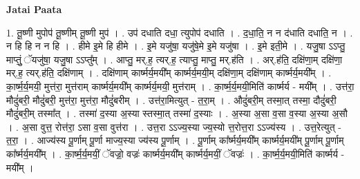 \documentclass[17pt]{extarticle}
\begin{document}
\textbf{Jatai Paata} \newline

1. तू॒ष्णी मुपोप॑ तू॒ष्णीम् तू॒ष्णी मुप॑ । . उप॑ दधाति दधा॒ त्युपोप॑ दधाति । . द॒धा॒ति॒ न न द॑धाति दधाति॒ न । . न हि हि न न हि । . हीमे इ॒मे हि हीमे । . इ॒मे यजु॑षा॒ यजु॑षे॒मे इ॒मे यजु॑षा । . इ॒मे इती॒मे । . यजु॒षा ऽऽप्तु॒ माप्तुं॒ ॅयजु॑षा॒ यजु॒षा ऽऽप्तु᳚म् । . आप्तु॒ मर्.ह॒ त्यर्.ह॒ त्याप्तु॒ माप्तु॒ मर्.ह॑ति । . अर्.ह॑ति॒ दक्षि॑णा॒म् दक्षि॑णा॒ मर्.ह॒ त्यर्.ह॑ति॒ दक्षि॑णाम् । . दक्षि॑णाम् कार्ष्मर्य॒मयी᳚म् कार्ष्मर्य॒मयी॒म् दक्षि॑णा॒म् दक्षि॑णाम् कार्ष्मर्य॒मयी᳚म् । . का॒र्ष्म॒र्य॒मयी॒ मुत्त॑रा॒ मुत्त॑राम् कार्ष्मर्य॒मयी᳚म् कार्ष्मर्य॒मयी॒ मुत्त॑राम् । . का॒र्ष्म॒र्य॒मयी॒मिति॑ कार्ष्मर्य - मयी᳚म् । . उत्त॑रा॒ मौदुं॑बरी॒ मौदुं॑बरी॒ मुत्त॑रा॒ मुत्त॑रा॒ मौदुं॑बरीम् । . उत्त॑रा॒मित्युत् - त॒रा॒म् । . औदुं॑बरी॒म् तस्मा॒त् तस्मा॒ दौदुं॑बरी॒ मौदुं॑बरी॒म् तस्मा᳚त् । . तस्मा॑ द॒स्या अ॒स्या स्तस्मा॒त् तस्मा॑ द॒स्याः । . अ॒स्या अ॒सा व॒सा व॒स्या अ॒स्या अ॒सौ । . अ॒सा वुत्त॒ रोत्त॑रा॒ ऽसा व॒सा वुत्त॑रा । . उत्त॒रा ऽऽज्य॒स्या ज्य॒स्यो त्त॒रोत्त॒रा ऽऽज्य॑स्य । . उत्त॒रेत्युत् - त॒रा॒ । . आज्य॑स्य पू॒र्णाम् पू॒र्णा माज्य॒स्या ज्य॑स्य पू॒र्णाम् । . पू॒र्णाम् का᳚र्ष्मर्य॒मयी᳚म् कार्ष्मर्य॒मयी᳚म् पू॒र्णाम् पू॒र्णाम् का᳚र्ष्मर्य॒मयी᳚म् । . का॒र्ष्म॒र्य॒मयीं॒ ॅवज्रो॒ वज्रः॑ कार्ष्मर्य॒मयी᳚म् कार्ष्मर्य॒मयीं॒ ॅवज्रः॑ । . का॒र्ष्म॒र्य॒मयी॒मिति॑ कार्ष्मर्य - मयी᳚म् । \newline
\end{document}
